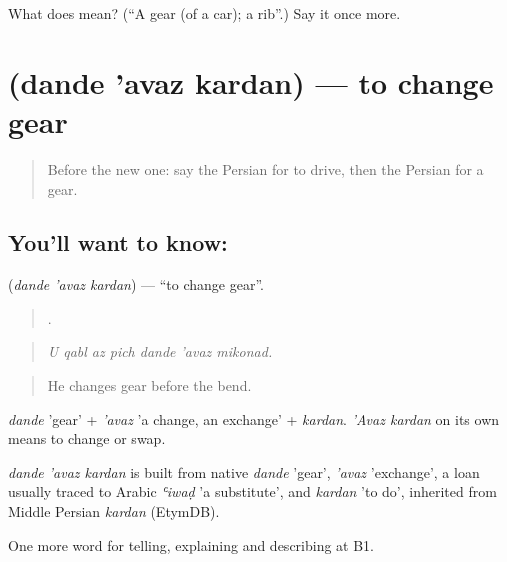 \begin{tcolorbox}[breakable,colback=teal!4,colframe=teal!35!black,title={Before you move on}]
What does  mean? (\textquotedblleft{}A gear (of a car); a rib\textquotedblright{}.) Say it once more.
\end{tcolorbox}
\section[\texorpdfstring{\fa{دنده} \fa{عوض} \fa{کردن} (dande 'avaz kardan)}{دنده عوض کردن (dande 'avaz kardan)}]{   (dande 'avaz kardan) — to change gear}

\label{lesson:FA-C420-dande-avaz-kardan}



\begin{quote}
Before the new one: say the Persian for to drive, then the Persian for a gear.
\end{quote}

\subsection*{You'll want to know:   }
\textbf{  } (\emph{dande 'avaz kardan}) — \textquotedblleft{}to change gear\textquotedblright{}.

\begin{quote}
      .
\end{quote}

\begin{quote}
\emph{U qabl az pich dande 'avaz mikonad.}
\end{quote}

\begin{quote}
He changes gear before the bend.
\end{quote}

\emph{dande} 'gear' + \emph{'avaz} 'a change, an exchange' + \emph{kardan}. \emph{'Avaz kardan} on its own means to change or swap.

\begin{cousinweb}
\emph{dande 'avaz kardan} is built from native \emph{dande} 'gear', \emph{'avaz} 'exchange', a loan usually traced to Arabic \emph{ʿiwaḍ} 'a substitute', and \emph{kardan} 'to do', inherited from Middle Persian \emph{kardan} (EtymDB).
\end{cousinweb}

\begin{grammarlens}[title={What you've built}]
One more word for telling, explaining and describing at B1.
\end{grammarlens}

